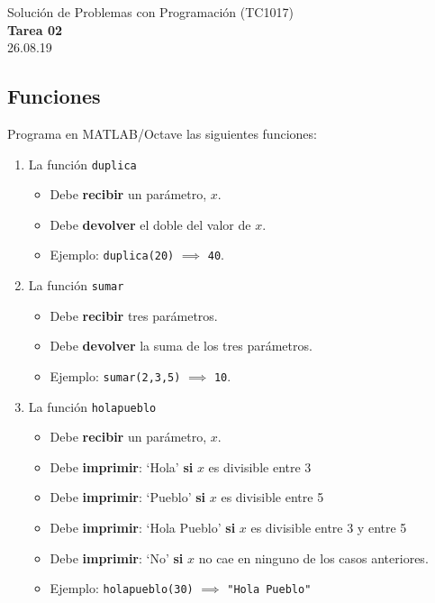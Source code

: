 \documentclass[]{book}
\newcommand{\matlab}[1]{\lstinline[style=Matlab-pyglike]!#1!}
\theoremstyle{definition}
\begin{document}
\begin{center}
{\huge Solución de Problemas con Programación (TC1017)}\\[1.5ex]
{\large \textbf{Tarea 02}\\[1.5ex] %
26.08.19} %
\end{center}

\vspace{0.2 cm}

\subsection*{Funciones}

Programa en MATLAB/Octave las siguientes funciones:

\begin{enumerate}[label=\alph*)]
    \itemsep2.5ex
    \item La función \matlab{duplica}
    \begin{itemize}
        \item Debe \textbf{recibir} un parámetro, $x$.
        \item Debe \textbf{devolver} el doble del valor de $x$.
        \item Ejemplo: \matlab{duplica(20)} $\implies$ \matlab{40}.
    \end{itemize}
    \item La función \matlab{sumar}
    \begin{itemize}
        \item Debe \textbf{recibir} tres parámetros.
        \item Debe \textbf{devolver} la suma de los tres parámetros.
        \item Ejemplo: \matlab{sumar(2,3,5)} $\implies$ \matlab{10}.
    \end{itemize}
    \item La función \matlab{holapueblo}
    \begin{itemize}
        \item Debe \textbf{recibir} un parámetro, $x$.
        \item Debe \textbf{imprimir}: `Hola' \textbf{si} $x$ es divisible entre 3
        \item Debe \textbf{imprimir}: `Pueblo' \textbf{si} $x$ es divisible entre 5
        \item Debe \textbf{imprimir}: `Hola Pueblo' \textbf{si} $x$ es divisible entre 3 y entre 5
        \item Debe \textbf{imprimir}: `No' \textbf{si} $x$ no cae en ninguno de los casos anteriores.
        \item Ejemplo: \matlab{holapueblo(30)} $\implies$ \texttt{"Hola Pueblo"}
    \end{itemize}
\end{enumerate}
\end{document}
